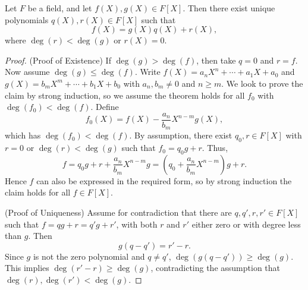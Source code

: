 

\begin{theorem}
  Let \( F \) be a field, and let \( f(X), g(X) \in F[X] \). Then there exist unique polynomials \( q(X), r(X) \in F[X] \) such that 
  \[ f(X) = g(X)q(X) + r(X), \]
  where \( \deg(r) < \deg(g) \) or \( r(X) = 0 \).
  \label{thm:divisionReminderPolynomial}
\end{theorem}

\begin{proof}
  (Proof of Existence) If \( \deg(g) > \deg(f) \), then take \( q = 0 \) and \( r = f \). Now assume \( \deg(g) \leq \deg(f) \). Write \( f(X) = a_nX^n + \cdots + a_1X + a_0 \) and \( g(X) = b_mX^m + \cdots + b_1X + b_0 \) with \( a_n, b_m \neq 0 \) and \( n \geq m \). We look to prove the claim by strong induction, so we assume the theorem holds for all \( f_0 \) with \( \deg(f_0) < \deg(f) \). Define
  \[ f_0(X) = f(X) - \frac{a_n}{b_m}X^{n-m} g(X), \]
  which has \( \deg(f_0) < \deg(f) \). By assumption, there exist \( q_0, r \in F[X] \) with \( r = 0 \) or \( \deg(r) < \deg(g) \) such that \( f_0 = q_0g + r \). Thus,
  \[ f = q_0g + r + \frac{a_n}{b_m}X^{n-m}g  =\left( q_0 + \frac{a_n}{b_m}X^{n-m} \right)g + r. \]
  Hence $f$ can also be expressed in the required form, so by strong induction the claim holds for all $f \in F[X].$

  (Proof of Uniqueness) Assume for contradiction that there are \( q, q', r, r' \in F[X] \) such that \( f = qg + r = q'g + r' \), with both $r$ and $r'$ either zero or with degree less than $g.$ 
  Then
  \[ g(q - q') = r' - r. \]
  Since \( g \) is not the zero polynomial and \( q \neq q' \), \( \deg(g(q - q')) \geq \deg(g) \). This implies \( \deg(r' - r) \geq \deg(g) \), contradicting the assumption that \( \deg(r), \deg(r') < \deg(g) \).
\end{proof}

